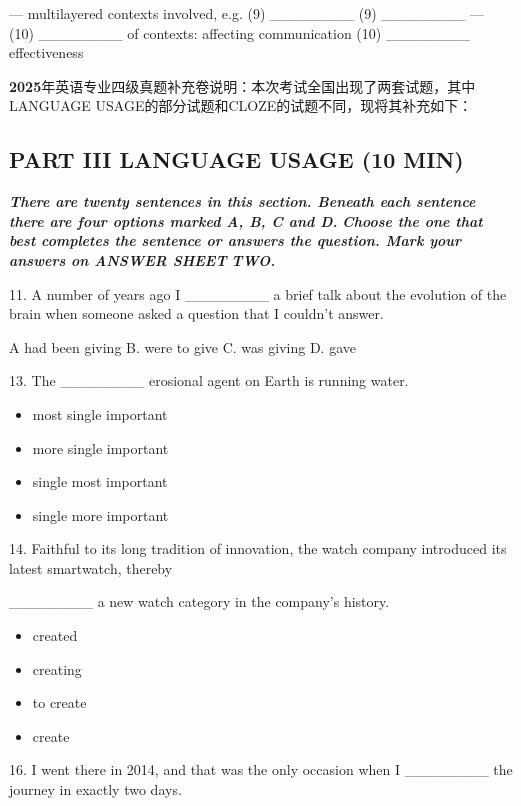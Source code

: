 \documentclass[UTF8,11pt]{ctexart}
\begin{document}
— multilayered contexts involved, e.g. (9) \_\_\_\_\_\_\_\_ (9) \_\_\_\_\_\_\_\_ — (10) \_\_\_\_\_\_\_\_ of contexts: affecting communication (10) \_\_\_\_\_\_\_\_ effectiveness


\textbf{2025}年英语专业四级真题补充卷说明：本次考试全国出现了两套试题，其中LANGUAGE USAGE的部分试题和CLOZE的试题不同，现将其补充如下：


\subsection*{\textbf{PART III LANGUAGE USAGE (10 MIN)}}


\textbf{\textit{There are twenty sentences in this section. Beneath each sentence there are four options marked A, B, C and D.}} \textbf{\textit{Choose the one that best completes the sentence or answers the question. Mark your answers on ANSWER SHEET}} \textbf{\textit{TWO.}}


11. A number of years ago I \_\_\_\_\_\_\_\_ a brief talk about the evolution of the brain when someone asked a question that I couldn’t answer.


A had been giving B. were to give C. was giving D. gave


13. The \_\_\_\_\_\_\_\_ erosional agent on Earth is running water.


\begin{itemize}[leftmargin=2em,itemsep=.2em,topsep=.4em]\item[A.] most single important
\item[B.] more single important
\item[C.] single most important
\item[D.] single more important
\end{itemize}

14. Faithful to its long tradition of innovation, the watch company introduced its latest smartwatch, thereby


\_\_\_\_\_\_\_\_ a new watch category in the company’s history.


\begin{itemize}[leftmargin=2em,itemsep=.2em,topsep=.4em]\item[A.] created
\item[B.] creating
\item[C.] to create
\item[D.] create
\end{itemize}

16. I went there in 2014, and that was the only occasion when I \_\_\_\_\_\_\_\_ the journey in exactly two days.
\end{document}
